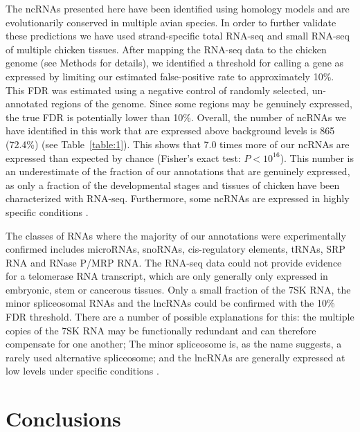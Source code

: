 \documentclass[10pt]{bmc_article}
\newenvironment{bmcformat}{\begin{raggedright}\baselineskip20pt\sloppy\setboolean{publ}{false}}{\end{raggedright}\baselineskip20pt\sloppy}
\begin{document}
\begin{bmcformat}
The ncRNAs presented here have been identified using homology models
and are evolutionarily conserved in multiple avian species. In order
to further validate these predictions we have used strand-specific
total RNA-seq and small RNA-seq of multiple chicken tissues. After
mapping the RNA-seq data to the chicken genome (see Methods for
details), we identified a threshold for calling a gene as expressed by
limiting our estimated false-positive rate to approximately 10\%. This
FDR was estimated using a negative control of randomly selected,
un-annotated regions of the genome. Since some regions may be
genuinely expressed, the true FDR is potentially lower than
10\%. Overall, the number of ncRNAs we have identified in this work
that are expressed above background levels is 865 (72.4\%) (see
Table~\ref{table:1}). This shows that 7.0 times more of our ncRNAs are
expressed than expected by chance (Fisher's exact test:
$P<10^{16}$). This number is an underestimate of the fraction of our
annotations that are genuinely expressed, as only a fraction of the
developmental stages and tissues of chicken have been characterized
with RNA-seq. Furthermore, some ncRNAs are expressed in highly
specific conditions \cite{mercer2008specific,johnston2003microrna}.

The classes of RNAs where the majority of our annotations were
experimentally confirmed includes microRNAs, snoRNAs, cis-regulatory
elements, tRNAs, SRP RNA and RNase P/MRP RNA. The RNA-seq data could
not provide evidence for a telomerase RNA transcript, which are only
generally only expressed in embryonic, stem or cancerous tissues. Only
a small fraction of the 7SK RNA, the minor spliceosomal RNAs and the
lncRNAs could be confirmed with the 10\% FDR threshold. There are a
number of possible explanations for this: the multiple copies of the
7SK RNA may be functionally redundant and can therefore compensate for
one another; The minor spliceosome is, as the name suggests, a rarely
used alternative spliceosome; and the lncRNAs are generally expressed
at low levels under specific conditions
\cite{mercer2008specific,mercer2012targeted}.


\section*{Conclusions}



\end{bmcformat}
\end{document}
